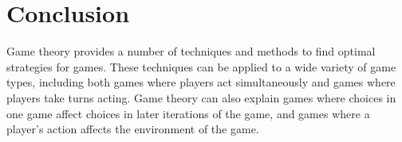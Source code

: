 \section{Conclusion}
Game theory provides a number of techniques and methods to find optimal strategies for games. These techniques can be applied to a wide variety of game types, including both games where players act simultaneously and games where players take turns acting. Game theory can also explain games where choices in one game affect choices in later iterations of the game, and games where a player's action affects the environment of the game.\\